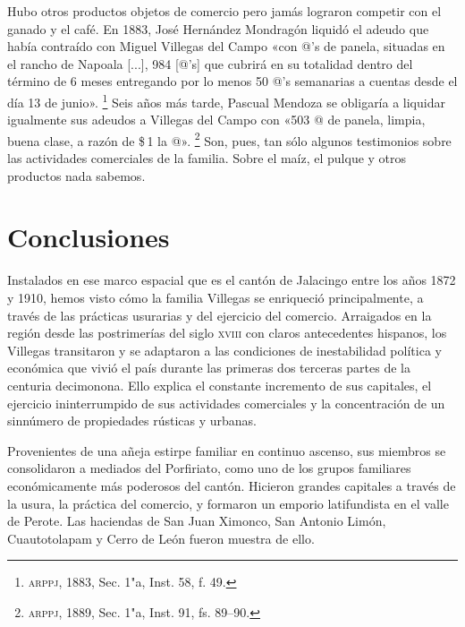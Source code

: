 \documentclass[14pt,twoside,final]{extbook} %
\let\oldfootnote\footnote
\renewcommand\footnote[1]{%
\oldfootnote{\hspace{1mm}#1}}
\begin{document}
Hubo otros productos objetos de comercio pero jamás lograron competir con el ganado y el café. En 1883, José Hernández Mondragón liquidó el adeudo que había contraído con Miguel Villegas del Campo «con @'s de panela, situadas en el rancho de Napoala [...], 984 [@'s] que cubrirá en su totalidad dentro del término de 6 meses entregando por lo menos 50 @'s semanarias a cuentas desde el día 13 de junio».\footnote{\textsc{arppj}, 1883, Sec. 1"a, Inst. 58, f. 49.} Seis años más tarde, Pascual Mendoza se obligaría a liquidar igualmente sus adeudos a Villegas del Campo con «503 @ de panela, limpia, buena clase, a razón de \$\,1 la @».\footnote{\textsc{arppj}, 1889, Sec. 1"a, Inst. 91, fs. 89--90.} Son, pues, tan sólo algunos testimonios sobre las actividades comerciales de la familia. Sobre el maíz, el pulque y otros productos nada sabemos.
\chapter*{Conclusiones}
\label{ch:conclusiones}
\thispagestyle{empty}
\pagestyle{fancy}
\fancyhf{} %
\fancyhead[RO,LE]{\iffloatpage{}{\thepage}}
\renewcommand\headrulewidth{\iffloatpage{0pt}{0pt}}
Instalados en ese marco espacial que es el cantón de Jalacingo entre los años 1872 y 1910, hemos visto cómo la familia Villegas se enriqueció principalmente, a través de las prácticas usurarias y del ejercicio del comercio. Arraigados en la región desde las postrimerías del siglo \textsc{xviii} con claros antecedentes hispanos, los Villegas transitaron y se adaptaron a las condiciones de inestabilidad política y económica que vivió el país durante las primeras dos terceras partes de la centuria decimonona. Ello explica el constante incremento de sus capitales, el ejercicio ininterrumpido de sus actividades comerciales y la concentración de un sinnúmero de propiedades rústicas y urbanas.

Provenientes de una añeja estirpe familiar en continuo ascenso, sus miembros se consolidaron a mediados del Porfiriato, como uno de los grupos familiares económicamente más poderosos del cantón. Hicieron grandes capitales a través de la usura, la práctica del comercio, y formaron un emporio latifundista en el valle de Perote. Las haciendas de San Juan Ximonco, San Antonio Limón, Cuautotolapam y Cerro de León fueron muestra de ello.
\end{document}
